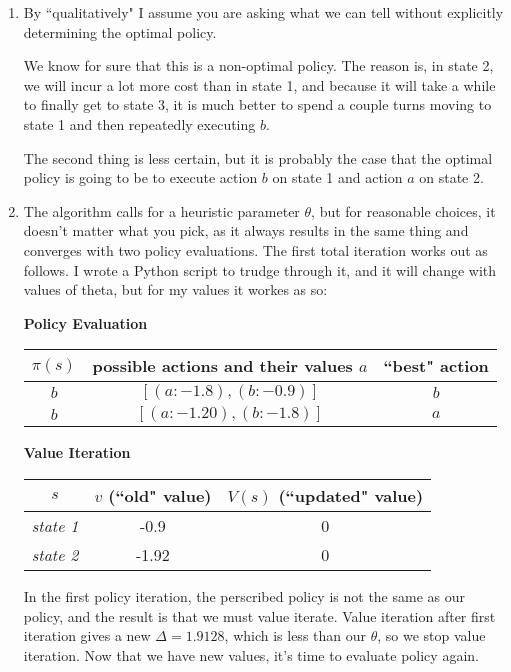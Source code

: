 \documentclass[11pt]{article}
\begin{document}
\begin{enumerate}
\item By ``qualitatively" I assume you are asking what we can tell without explicitly determining the optimal policy.

We know for sure that this is a non-optimal policy. The reason is, in state 2, we will incur a lot more cost than in state 1, and because it will take a while to finally get to state 3, it is much better to spend a couple turns moving to state 1 and then repeatedly executing $b$.

The second thing is less certain, but it is probably the case that the optimal policy is going to be to execute action $b$ on state 1 and action $a$ on state 2.

\item The algorithm calls for a heuristic parameter $\theta$, but for reasonable choices, it doesn't matter what you pick, as it always results in the same thing and converges with two policy evaluations. The first total iteration works out as follows. I wrote a Python script to trudge through it, and it will change with values of theta, but for my values it workes as so:

\begin{center}
\textbf{Policy Evaluation}
\begin{tabular}{ | c | c | c | }
\hline
  $\pi(s)$ & possible actions and their values $a$ & ``best" action \\
  \hline
  \hline
  $b$ & $[(a:-1.8), (b:-0.9)]$ & $b$ \\
  $b$ & $[(a: -1.20), (b: -1.8)]$ & $a$ \\
  \hline
\end{tabular}
\end{center}

\begin{center}
\textbf{Value Iteration}
\begin{tabular}{ | c | c | c | }
\hline
  $s$ & $v$ (``old" value) & $V(s)$ (``updated" value) \\
  \hline
  \hline
  \textit{state 1} & -0.9 & 0 \\
  \textit{state 2} & -1.92 & 0 \\
  \hline
\end{tabular}
\end{center}

In the first policy iteration, the perscribed policy is not the same as our policy, and the result is that we must value iterate. Value iteration after first iteration gives a new $\Delta = 1.9128$, which is less than our $\theta$, so we stop value iteration. Now that we have new values, it's time to evaluate policy again.


\end{enumerate}
\end{document}
